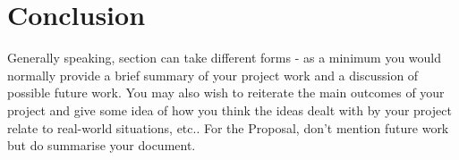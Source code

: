 
\chapter{Conclusion}

Generally speaking, section can take different forms - as a minimum you would
normally provide a brief summary of your project work and a discussion of possible future work. You
may also wish to reiterate the main outcomes of your project and give some idea of how you think
the ideas dealt with by your project relate to real-world situations, etc.. For the Proposal, don’t
mention future work but do summarise your document.
